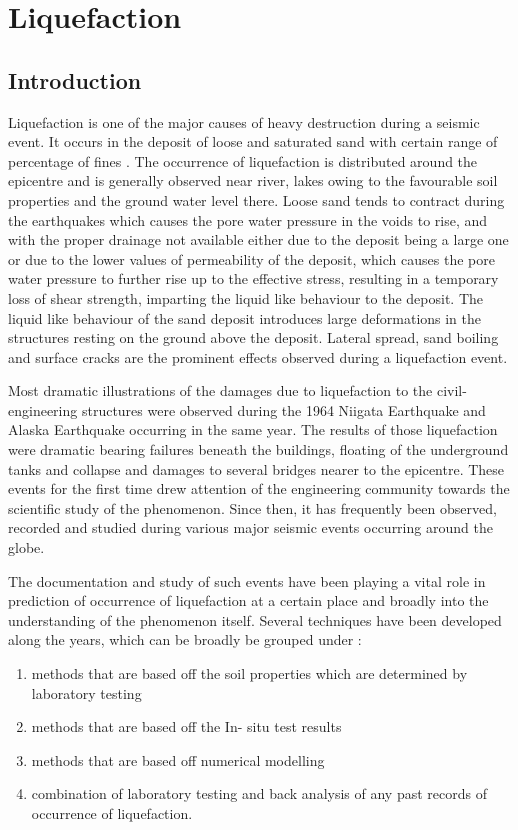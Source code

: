 \section{Liquefaction}
\subsection{Introduction}
Liquefaction is one of the major causes of heavy destruction during a seismic event. It occurs in the deposit of loose and saturated sand with certain range of percentage of fines \cite{r11}. The occurrence of liquefaction is distributed around the epicentre and is generally observed near river, lakes owing to the favourable soil properties and the ground water level there.  Loose sand tends to contract during the earthquakes which causes the pore water pressure in the voids to rise, and with the proper drainage not available either due to the deposit being a large one or due to the lower values of permeability of the deposit, which causes the pore water pressure to further rise up to the effective stress, resulting in a temporary loss of shear strength, imparting the liquid like behaviour to the deposit. The liquid like behaviour of the sand deposit introduces large deformations in the structures resting on the ground above the deposit. Lateral spread, sand boiling and surface cracks are the prominent effects observed during a liquefaction event.

Most dramatic illustrations of the damages due to liquefaction to the civil-engineering structures were observed during the 1964 Niigata Earthquake and Alaska Earthquake occurring in the same year. The results of those liquefaction were dramatic bearing failures beneath the buildings, floating of the underground tanks and collapse and damages to several bridges nearer to the epicentre. These events for the first time drew attention of the engineering community towards the scientific study of the phenomenon. Since then, it has frequently been observed, recorded and studied during various major seismic events occurring around the globe. 

The documentation and study of such events have been playing a vital role in prediction of occurrence of liquefaction at a certain place and broadly into the understanding of the phenomenon itself. Several techniques have been developed along the years, which can be broadly be grouped under :
\begin{enumerate}
\item methods that are based off the soil properties which are determined by laboratory testing
\item methods that are based off the In- situ test results
\item methods that are based off numerical modelling
\item combination of laboratory testing and back analysis of any past records of occurrence of liquefaction.
\end{enumerate}

